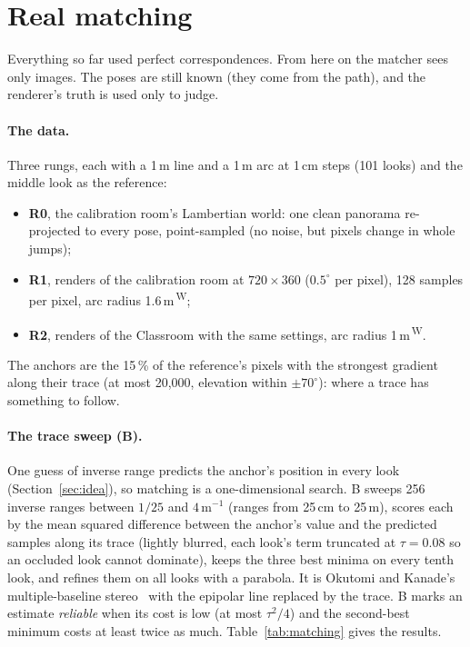 \documentclass[11pt,a4paper]{article}
\newcommand{\src}[1]{\textsuperscript{\,#1}}
\newcommand{\WS}{\src{W}}   %
\begin{document}
\FloatBarrier
\section{Real matching}\label{sec:matching}

Everything so far used perfect correspondences. From here on the matcher sees only images. The poses are still known
(they come from the path), and the renderer's truth is used only to judge.

\paragraph{The data.} Three rungs, each with a 1\,m line and a 1\,m arc at 1\,cm steps (101 looks) and the middle look as
the reference:
\begin{itemize}
\item \textbf{R0}, the calibration room's Lambertian world: one clean panorama re-projected to every pose, point-sampled
  (no noise, but pixels change in whole jumps);
\item \textbf{R1}, renders of the calibration room at $720\times360$ ($0.5^\circ$ per pixel), 128 samples per pixel, arc radius 1.6\,m\WS;
\item \textbf{R2}, renders of the Classroom with the same settings, arc radius 1\,m\WS.
\end{itemize}
The anchors are the 15\,\% of the reference's pixels with the strongest gradient along their trace (at most 20{,}000,
elevation within $\pm70^\circ$): where a trace has something to follow.

\paragraph{The trace sweep (B).} One guess of inverse range predicts the anchor's position in every look
(Section~\ref{sec:idea}), so matching is a one-dimensional search. B sweeps 256 inverse ranges between $1/25$ and $4$\,m$^{-1}$ (ranges from 25\,cm to 25\,m), scores each by the mean squared difference between the anchor's value and
the predicted samples along its trace (lightly blurred, each look's term truncated at $\tau=0.08$ so an occluded look
cannot dominate), keeps the three best minima on every tenth look, and refines them on all looks with a parabola. It is
Okutomi and Kanade's multiple-baseline stereo~\cite{okutomi} with the epipolar line replaced by the trace. B marks an
estimate \emph{reliable} when its cost is low (at most $\tau^2/4$) and the second-best minimum costs at least twice as
much. Table~\ref{tab:matching} gives the results.
\end{document}
